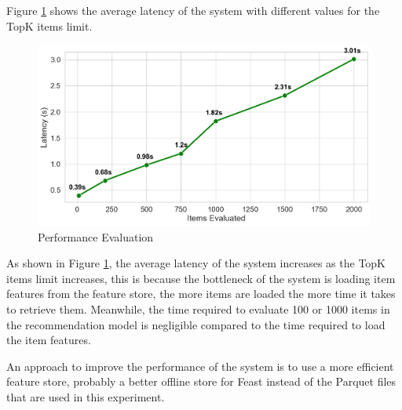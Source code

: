 Figure \ref{fig: PerformanceEvaluation} shows the average latency of the system with different values for the TopK items limit.

\begin{figure}[H]
    \centering
    \includegraphics[width=\textwidth]{assets/performance_benchmark.png}
    \caption{Performance Evaluation}
    \label{fig: PerformanceEvaluation}
\end{figure}

As shown in Figure \ref{fig: PerformanceEvaluation}, the average latency of the system increases as the TopK items limit increases, this is because the bottleneck of the system is loading item features from the feature store, the more items are loaded the more time it takes to retrieve them.
Meanwhile, the time required to evaluate 100 or 1000 items in the recommendation model is negligible compared to the time required to load the item features.

An approach to improve the performance of the system is to use a more efficient feature store, probably a better offline store for Feast instead of the Parquet files that are used in this experiment.


